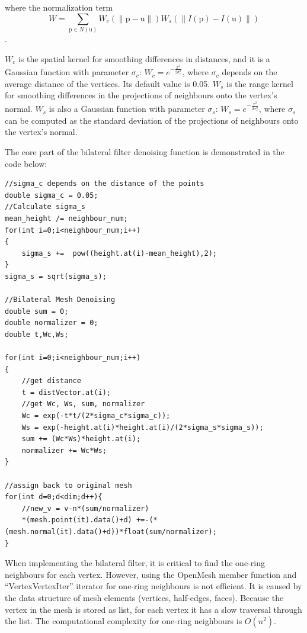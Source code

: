 where the normalization term
\begin{equation} \label{normalizer}
W = \sum_{\bm{\mathrm{p}} \in N(\bm{\mathrm{u}})}W_c(\|\bm{\mathrm{p}}-\bm{\mathrm{u}}\|)W_s(\|I(\bm{\mathrm{p}})-I(\bm{\mathrm{u}})\|)
\end{equation}.

$W_c$ is the spatial kernel for smoothing differences in distances, and it is a Gaussian function with parameter $\sigma_c$: $W_c=e^{-\frac{x^2}{2 \sigma_c^2}}$, where $\sigma_c$ depends on the average distance of the vertices. Its default value is 0.05. $W_s$ is the range kernel for smoothing differences in the projections of neighbours onto the vertex's normal. $W_s$ is also a Gaussian function with parameter $\sigma_s$: $W_s=e^{-\frac{x^2}{2 \sigma_s^2}}$, where $\sigma_s$ can be computed as the standard deviation of the projections of neighbours onto the vertex's normal. 

The core part of the bilateral filter denoising function is demonstrated in the code below:
\begin{lstlisting}[xleftmargin=1em]
//sigma_c depends on the distance of the points
double sigma_c = 0.05; 
//Calculate sigma_s
mean_height /= neighbour_num;
for(int i=0;i<neighbour_num;i++)
{
	sigma_s +=  pow((height.at(i)-mean_height),2);
}
sigma_s = sqrt(sigma_s);

//Bilateral Mesh Denoising
double sum = 0;
double normalizer = 0;
double t,Wc,Ws;

for(int i=0;i<neighbour_num;i++)
{
	//get distance
	t = distVector.at(i);
	//get Wc, Ws, sum, normalizer
	Wc = exp(-t*t/(2*sigma_c*sigma_c));
	Ws = exp(-height.at(i)*height.at(i)/(2*sigma_s*sigma_s));
	sum += (Wc*Ws)*height.at(i);
	normalizer += Wc*Ws;
}

//assign back to original mesh
for(int d=0;d<dim;d++){
	//new_v = v-n*(sum/normalizer)
	*(mesh.point(it).data()+d) +=-(*(mesh.normal(it).data()+d))*float(sum/normalizer);
}
\end{lstlisting}

When implementing the bilateral filter, it is critical to find the one-ring neighbours for each vertex. However, using the OpenMesh member function and ``VertexVertexIter'' iterator for one-ring neighbours is not efficient. It is caused by the data structure of mesh elements (vertices, half-edges, faces). Because the vertex in the mesh is stored as list, for each vertex it has a slow traversal through the list. The computational complexity for one-ring neighbours is $O(n^2)$. 

